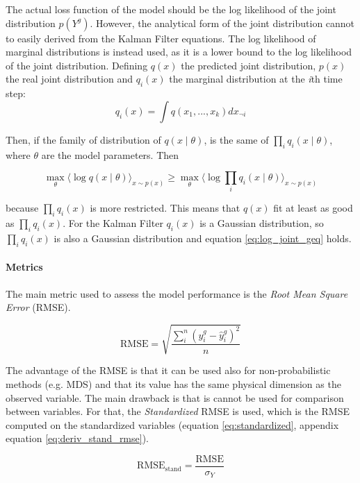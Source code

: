 \documentclass{article}
\newcommand{\E}[1]{\langle #1 \rangle} %
\begin{document}
The actual loss function of the model should be the log likelihood of the joint distribution $p(Y^g)$. However, the analytical form of the joint distribution cannot to easily derived from the Kalman Filter equations. The log likelihood of marginal distributions is instead used, as it is a lower bound to the log likelihood of the joint distribution. Defining $q(x)$ the predicted joint distribution, $p(x)$ the real joint distribution and $q_i(x)$ the marginal distribution at the \textit{i}th time step:
\begin{equation}
    q_i(x) = \int q(x_1, ..., x_k)dx_{\neg i}
\end{equation}

Then, if the family of distribution of $q(x \mid \theta)$,  is the same of $\prod_i q_i(x \mid \theta)$, where $\theta$ are the model parameters. Then

\begin{equation}\label{eq:log_joint_geq}
    \max_\theta \E{\log q(x\mid \theta)}_{x \sim p(x)} \geq \max_\theta \E{\log \prod_i q_i(x\mid \theta)}_{x \sim p(x)}
\end{equation}

because $\prod_i q_i(x)$ is more restricted. This means that $q(x)$ fit at least as good as $\prod_i q_i(x)$.
For the Kalman Filter $q_i(x)$ is a Gaussian distribution, so $\prod_i q_i(x)$ is also a Gaussian distribution and equation \ref{eq:log_joint_geq} holds.

\paragraph{Metrics}

The main metric used to assess the model performance is the \emph{Root Mean Square Error} (RMSE). 

\begin{equation}
    \text{RMSE} = \sqrt{\frac{\sum_i^n (y^g_i - \hat{y}^g_i)^2}{n}}
\end{equation}

The advantage of the RMSE is that it can be used also for non-probabilistic methods (e.g. MDS) and that its value has the same physical dimension as the observed variable. The main drawback is that is cannot be used for comparison between variables. For that, the \emph{Standardized} RMSE is used, which is the RMSE computed on the standardized variables (equation \ref{eq:standardized}, appendix equation \ref{eq:deriv_stand_rmse}).

\begin{equation}
    \text{RMSE}_{\text{stand}} = \frac{\text{RMSE}}{\sigma_Y} 
\end{equation}
\end{document}
